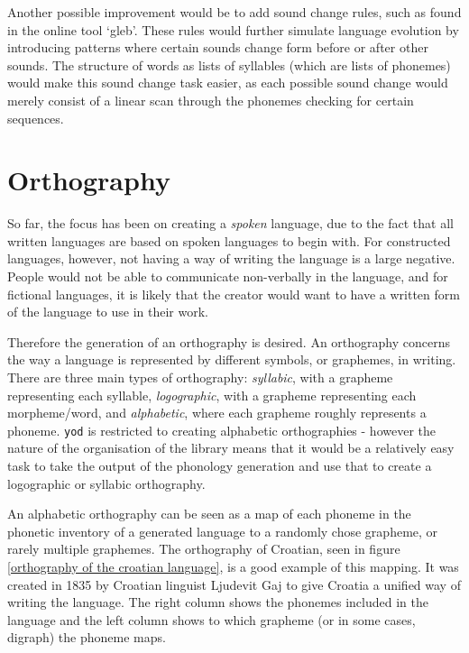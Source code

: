 \documentclass{report}
\begin{document}
	Another possible improvement would be to add sound change rules, such as found in the online tool `gleb'\cite{gleb}. These rules would further simulate language evolution by introducing patterns where certain sounds change form before or after other sounds. The structure of words as lists of syllables (which are lists of phonemes) would make this sound change task easier, as each possible sound change would merely consist of a linear scan through the phonemes checking for certain sequences.
	
	\chapter{Orthography}
	\label{chapter: orthography}
	
	So far, the focus has been on creating a \textit{spoken} language, due to the fact that all written languages are based on spoken languages to begin with. For constructed languages, however, not having a way of writing the language is a large negative. People would not be able to communicate non-verbally in the language, and for fictional languages, it is likely that the creator would want to have a written form of the language to use in their work.
	
	Therefore the generation of an orthography is desired. An orthography concerns the way a language is represented by different symbols, or graphemes, in writing. There are three main types of orthography: \textit{syllabic}, with a grapheme representing each syllable, \textit{logographic}, with a grapheme representing each morpheme/word, and \textit{alphabetic}, where each grapheme roughly represents a phoneme. \texttt{yod} is restricted to creating alphabetic orthographies - however the nature of the organisation of the library means that it would be a relatively easy task to take the output of the phonology generation and use that to create a logographic or syllabic orthography.
	
	An alphabetic orthography can be seen as a map of each phoneme in the phonetic inventory of a generated language to a randomly chose grapheme, or rarely multiple graphemes. The orthography of Croatian, seen in figure \ref{orthography of the croatian language}, is a good example of this mapping. It was created in 1835 by Croatian linguist Ljudevit Gaj to give Croatia a unified way of writing the language. The right column shows the phonemes included in the language and the left column shows to which grapheme (or in some cases, digraph) the phoneme maps.
	
\end{document}
